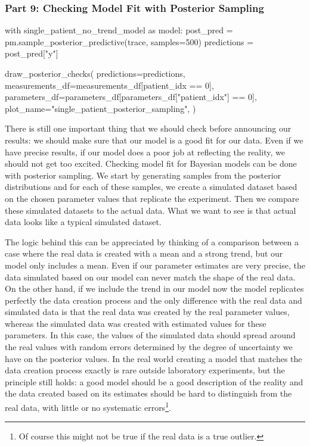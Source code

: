 \documentclass[12pt,a4paper,leqno]{report}
\theoremstyle{plain}
\theoremstyle{definition}
\theoremstyle{remark}
\begin{document}
\subsubsection*{Part 9: Checking Model Fit with Posterior Sampling}

\bigskip
\begin{pyverbatim}[][fontsize=\footnotesize]
    with single_patient_no_trend_model as model:
        post_pred = pm.sample_posterior_predictive(trace, samples=500)
        predictions = post_pred["y"]

    draw_posterior_checks(
        predictions=predictions,
        measurements_df=measurements_df[patient_idx == 0],
        parameters_df=parameters_df[parameters_df["patient_idx"] == 0],
        plot_name="single_patient_posterior_sampling",
    )
\end{pyverbatim}
\smallskip

There is still one important thing that we should check before announcing our results: we should
make sure that our model is a good fit for our data. Even if we have precise
results, if our model does a poor job at reflecting the reality, we should not get too
excited.
Checking model fit for Bayesian models can be done with posterior sampling. We start by generating samples from
the posterior distributions and for each of these samples, we create a simulated dataset based
on the chosen parameter values that replicate the experiment. Then we compare these
simulated datasets to the actual data. What we want to see is that actual data looks
like a typical simulated dataset.

The logic behind this can be appreciated by thinking of a comparison between a case
where the real data is created with a mean and a strong trend, but our model only includes a
mean. Even if our parameter estimates are very precise, the data simulated based on our
model can never match the shape of the real data. On the other hand, if we include the trend in our
model now the model replicates perfectly the data creation process and
the only difference with the real data and simulated data is that the real data was
created by the real parameter values, whereas the simulated data was created with
estimated values for these parameters. In this case, the values of the simulated data
should spread around the real values with random errors determined by the degree
of uncertainty we have on the posterior values. In the real world creating a model that
matches the data creation process exactly is rare outside laboratory experiments, but
the principle still holds: a good model should be a good description of the reality and
the data created based on its estimates should be hard to distinguish from the real
data, with little or no systematic errors\footnote{Of course this might not be true if the
real data is a true outlier.}.
\end{document}
